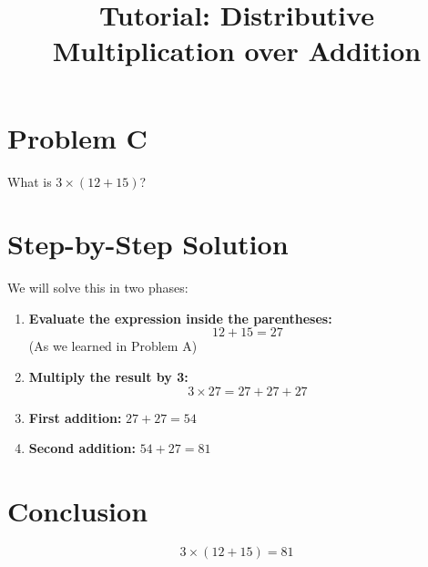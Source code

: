 \documentclass{article}
\begin{document}
\title{Tutorial: Distributive Multiplication over Addition}
\date{}
\maketitle

\section*{Problem C}
What is $3 \times (12 + 15)$?

\section*{Step-by-Step Solution}

We will solve this in two phases:
\begin{enumerate}[label=Step \arabic*:, leftmargin=*]
    \item \textbf{Evaluate the expression inside the parentheses:}
          \[
              12 + 15 = 27
          \]
          (As we learned in Problem A)

    \item \textbf{Multiply the result by 3:}
          \[
              3 \times 27 = 27 + 27 + 27
          \]

    \item \textbf{First addition:} $27 + 27 = 54$

    \item \textbf{Second addition:} $54 + 27 = 81$
\end{enumerate}

\section*{Conclusion}
\[
    3 \times (12 + 15) = 81
\]
\end{document}
